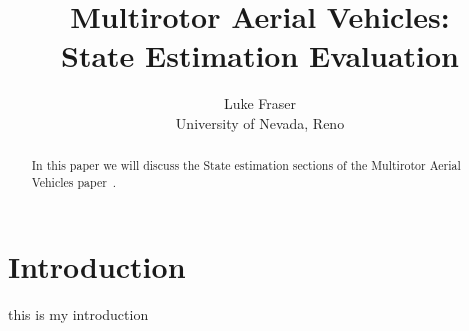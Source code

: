 \documentclass[conference]{IEEEtran}
\title{Multirotor Aerial Vehicles:\\State Estimation Evaluation}
\author{Luke Fraser\\
University of Nevada, Reno}
\begin{document}
\maketitle

\begin{abstract}
In this paper we will discuss the State estimation sections of the Multirotor Aerial Vehicles paper~\cite{6289431}.
\end{abstract}

\section{Introduction}
this is my introduction



\end{document}

